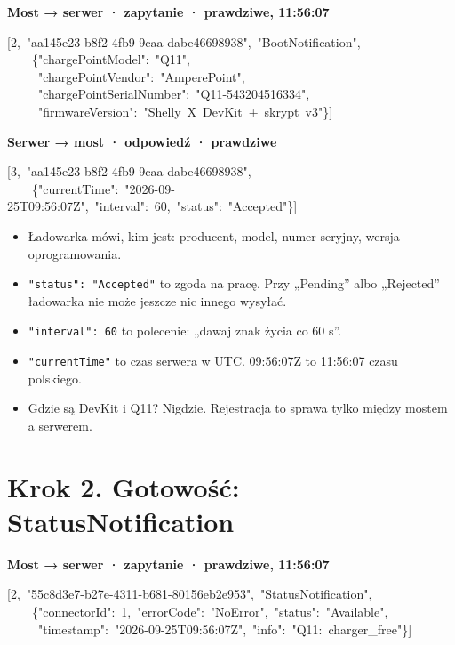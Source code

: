 \documentclass[11pt,a4paper]{article}
\begin{document}
\textbf{Most {\symbolfont→} serwer · zapytanie ·  prawdziwe, 11:56:07}


\begin{kodbox}
\mbox{}[2,\ "aa145e23-b8f2-4fb9-9caa-dabe46698938",\ "BootNotification",\\
\mbox{}\ \ \ \ \{"chargePointModel":\ "Q11",\\
\mbox{}\ \ \ \ \ "chargePointVendor":\ "AmperePoint",\\
\mbox{}\ \ \ \ \ "chargePointSerialNumber":\ "Q11-543204516334",\\
\mbox{}\ \ \ \ \ "firmwareVersion":\ "Shelly\ X\ DevKit\ +\ skrypt\ v3"\}]
\end{kodbox}

\textbf{Serwer {\symbolfont→} most · odpowiedź ·  prawdziwe}


\begin{kodbox}
\mbox{}[3,\ "aa145e23-b8f2-4fb9-9caa-dabe46698938",\\
\mbox{}\ \ \ \ \{"currentTime":\ "2026-09-25T09:56:07Z",\ "interval":\ 60,\ "status":\ "Accepted"\}]
\end{kodbox}

\begin{itemize}
\item Ładowarka mówi, kim jest: producent, model, numer seryjny, wersja oprogramowania.
\item \texttt{"status":\allowbreak{} "Accepted"} to zgoda na pracę. Przy „Pending” albo „Rejected” ładowarka nie może jeszcze nic innego wysyłać.
\item \texttt{"interval":\allowbreak{} 60} to polecenie: „dawaj znak życia co 60 s”.
\item \texttt{"currentTime"} to czas serwera w UTC. 09:56:07Z to 11:56:07 czasu polskiego.
\item Gdzie są DevKit i Q11? Nigdzie. Rejestracja to sprawa tylko między mostem a serwerem.
\end{itemize}

\section*{Krok 2. Gotowość: StatusNotification}

\textbf{Most {\symbolfont→} serwer · zapytanie ·  prawdziwe, 11:56:07}


\begin{kodbox}
\mbox{}[2,\ "55c8d3e7-b27e-4311-b681-80156eb2e953",\ "StatusNotification",\\
\mbox{}\ \ \ \ \{"connectorId":\ 1,\ "errorCode":\ "NoError",\ "status":\ "Available",\\
\mbox{}\ \ \ \ \ "timestamp":\ "2026-09-25T09:56:07Z",\ "info":\ "Q11:\ charger\_free"\}]
\end{kodbox}
\end{document}
